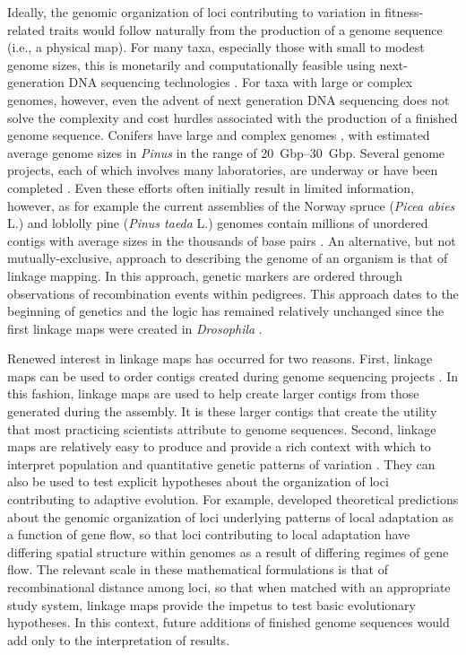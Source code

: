 \documentclass[smallextended]{svjour3}
\begin{document}
Ideally, the genomic organization of loci contributing to variation in fitness-related traits would follow 
naturally from the production of a genome sequence (i.e., a physical map). For many taxa, especially those with 
small to modest genome sizes, this is monetarily and computationally feasible using next-generation DNA sequencing 
technologies \citep{Koboldt:2013}. For taxa with large or complex genomes, however, even the advent of next generation DNA 
sequencing does not solve the complexity and cost hurdles associated with the production of a finished genome sequence. Conifers 
have large and complex genomes \citep{Murray:1998, Ahuja:2005}, with estimated average genome sizes in \textit{Pinus} in the 
range of \SIrange{20}{30}{Gbp}. Several genome projects, each of which involves many laboratories, are underway or have been 
completed \citep{Mackay:2012}. Even these efforts often initially result in limited information, however,
as for example the current assemblies of the Norway spruce (\textit{Picea abies} L.) and loblolly pine (\textit{Pinus taeda} L.) genomes 
contain millions of unordered contigs with average sizes in the thousands of base pairs \citep{Nystedt:2013, Neale:2014}. An alternative, 
but not mutually-exclusive, approach to describing the genome of an organism 
is that of linkage mapping. In this approach, genetic markers are ordered through observations of recombination events 
within pedigrees. This approach dates to the beginning of genetics and the logic has remained relatively unchanged 
since the first linkage maps were created in \textit{Drosophila} \citep{Sturtevant:1913}.

Renewed interest in linkage maps has occurred for two reasons. First, linkage maps can be used to order contigs 
created during genome sequencing projects \citep{Mackay:2012, Martinez-Garcia:2013}. In this fashion, linkage 
maps are used to help create larger contigs from those generated during the assembly. It is these larger contigs that 
create the utility that most practicing scientists attribute to genome sequences. Second, linkage maps are relatively 
easy to produce and provide a rich context with which to interpret population and quantitative genetic patterns of variation 
\citep[e.g.,][]{Eckert:2010a, Eckert:2010b, Eckert:2013a, Yeaman:2013}. They can also be used to test explicit hypotheses about 
the organization of loci contributing to adaptive evolution. For example, \citet{Yeaman:2011} developed theoretical 
predictions about the genomic organization of loci underlying patterns of local adaptation as a function of gene flow, 
so that loci contributing to local adaptation have differing spatial structure within genomes as a result of differing 
regimes of gene flow. The relevant scale \citep[\textit{sensu}][]{Houle:2011} in these mathematical formulations is that 
of recombinational distance among loci, so that when matched with an appropriate study system, 
linkage maps provide the impetus to test basic evolutionary hypotheses. In this context, future additions of finished 
genome sequences would add only to the interpretation of results.
\end{document}
